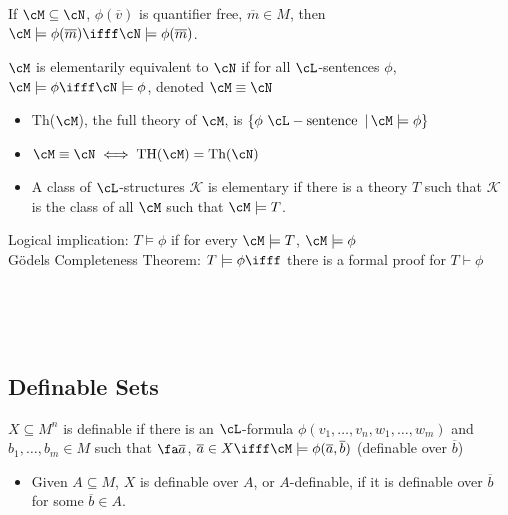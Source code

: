 \begin{proposition}
    If $\cM \subseteq \cN$, $\phi(\overline{v})$ is quantifier free, $\overline{m} \in M$, then $\cM \models \phi(\overline{m}) \ifff \cN \models \phi(\overline{m})$.
\end{proposition}

\begin{definition}
    $\cM$ is elementarily equivalent to $\cN$ if for all $\cL$-sentences $\phi$, $\cM \models \phi \ifff \cN \models \phi$, denoted $\cM \equiv \cN$
\end{definition}

\begin{itemize}
    \item Th($\cM$), the full theory of $\cM$, is $\{ \phi \, \, \cL-\text{sentence } \, | \, \cM \models \phi \}$
    \item $\cM \equiv \cN \iff \text{TH}(\cM) = \text{Th}(\cN)$
    \item A class of $\cL$-structures $\mathcal{K}$ is elementary if there is a theory $T$ such that $\mathcal{K}$ is the class of all $\cM$ such that $\cM \models T$.
\end{itemize}

\noindent
Logical implication: $T \models \phi$ if for every $\cM \models T$, $\cM \models \phi$ \\
G{\"o}dels Completeness Theorem: $T \models \phi \ifff$ there is a formal proof for $T \vdash \phi$  

\mbox{} \\
\mbox{} \\
\mbox{} \\

\subsection{Definable Sets}

\begin{definition}
    $X \subseteq M^n$ is definable if there is an $\cL$-formula $\phi(v_1, \ldots, v_n, w_1, \ldots, w_m)$ and $b_1, \ldots, b_m \in M$ such that $\fa \overline{a}$, $\overline{a} \in X \ifff \cM \models \phi(\overline{a}, \overline{b})$ (definable over $\overline{b}$) 
    \begin{itemize}
        \item Given $A \subseteq M$, $X$ is definable over $A$, or $A$-definable, if it is definable over $\overline{b}$ for some $\overline{b} \in A$.
    \end{itemize}
\end{definition} 

